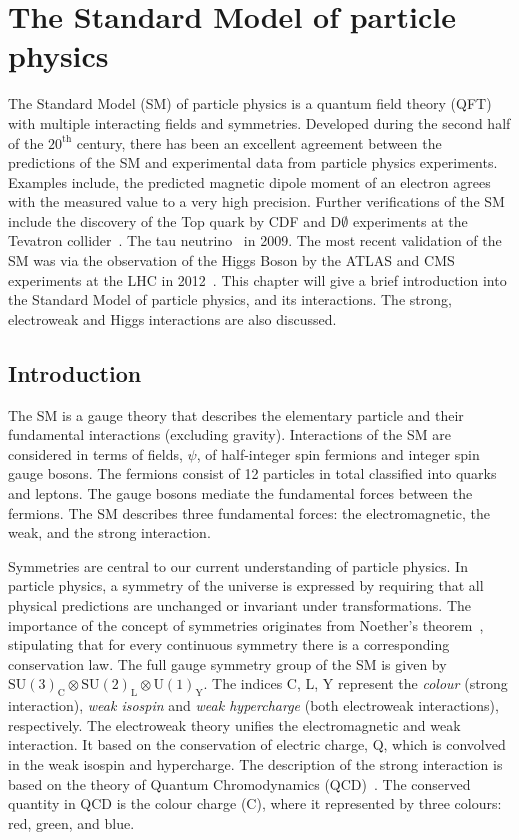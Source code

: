 \def \vacr {{\lvert\mkern1.5mu0\mkern1.5mu\rangle}}
\def \vacl {{\langle\mkern1.5mu0\mkern1.5mu\rvert}}

\chapter{The Standard Model of particle physics}\label{chap:SM}
The Standard Model (SM) of particle physics is a quantum field theory (QFT) with multiple interacting fields and symmetries. Developed during the second half of the $20^{\mathrm{th}}$ century, there has been an excellent agreement between the predictions of the SM and experimental data from particle physics experiments. Examples include, the predicted magnetic dipole moment of an electron agrees with the measured value to a very high precision. Further verifications of the SM include the discovery of the Top quark by CDF and D$\emptyset$ experiments at the Tevatron \protonproton collider~\cite{Abe1995,Abachi1995}. The tau neutrino~\cite{Kodama_2001} in 2009. The most recent validation of the SM was via the observation of the Higgs Boson by the ATLAS and CMS experiments at the LHC in 2012~\cite{Chatrchyan2012,Aad_2012}. This chapter will give a brief introduction into the Standard Model of particle physics, and its interactions. The strong, electroweak and Higgs interactions are also discussed. 

\section{Introduction}
The SM is a gauge theory that describes the elementary particle and their fundamental interactions (excluding gravity). Interactions of the SM are considered in terms of fields, $\psi$, of half-integer spin fermions and integer spin gauge bosons. The fermions consist of 12 particles in total classified into quarks and leptons. The gauge bosons mediate the fundamental forces between the fermions. The SM describes three fundamental forces: the electromagnetic, the weak, and the strong interaction.  

Symmetries are central to our current understanding of particle physics. In particle physics, a symmetry of the universe is expressed by requiring that all physical predictions are unchanged or invariant under transformations. The importance of the concept of symmetries originates from Noether's theorem~\cite{Noether1918}, stipulating that for every continuous symmetry there is a corresponding conservation law. The full gauge symmetry group of the SM is given by $\mathrm{SU(3)}_\mathrm{C} \otimes \mathrm{SU(2)}_\mathrm{L} \otimes \mathrm{U(1)}_\mathrm{Y}$. The indices C, L, Y represent the \emph{colour} (strong interaction), \emph{weak isospin} and \emph{weak hypercharge} (both electroweak interactions), respectively. The electroweak theory unifies the electromagnetic and weak interaction. It based on the conservation of electric charge, Q, which is convolved in the weak isospin and hypercharge. The description of the strong interaction is based on the theory of Quantum Chromodynamics (QCD)~\cite{Zweig:1964jf}. The conserved quantity in QCD is the colour charge (C), where it represented by three colours: red, green, and blue. 

